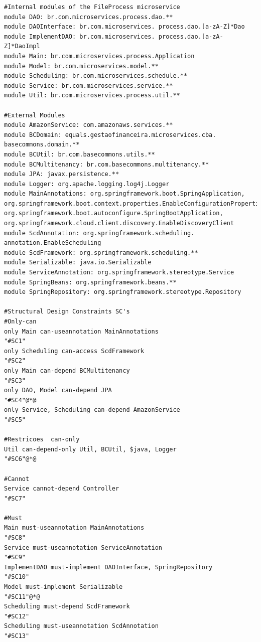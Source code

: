 \documentclass[12pt]{article}
\begin{document}
\begin{lstlisting}[style=colorido, caption={\textcolor{blue}{FileProcess microservice's architectural project specification.}},label={list:especArquiteturalFileProccess}
]
#Internal modules of the FileProcess microservice
module DAO: br.com.microservices.process.dao.**
module DAOInterface: br.com.microservices. process.dao.[a-zA-Z]*Dao
module ImplementDAO: br.com.microservices. process.dao.[a-zA-Z]*DaoImpl
module Main: br.com.microservices.process.Application
module Model: br.com.microservices.model.**
module Scheduling: br.com.microservices.schedule.**
module Service: br.com.microservices.service.**
module Util: br.com.microservices.process.util.**

#External Modules
module AmazonService: com.amazonaws.services.**
module BCDomain: equals.gestaofinanceira.microservices.cba. basecommons.domain.**
module BCUtil: br.com.basecommons.utils.**
module BCMultitenancy: br.com.basecommons.multitenancy.**
module JPA: javax.persistence.**
module Logger: org.apache.logging.log4j.Logger
module MainAnnotations: org.springframework.boot.SpringApplication, org.springframework.boot.context.properties.EnableConfigurationProperties, org.springframework.boot.autoconfigure.SpringBootApplication, org.springframework.cloud.client.discovery.EnableDiscoveryClient
module ScdAnnotation: org.springframework.scheduling. annotation.EnableScheduling
module ScdFramework: org.springframework.scheduling.**
module Serializable: java.io.Serializable
module ServiceAnnotation: org.springframework.stereotype.Service
module SpringBeans: org.springframework.beans.**
module SpringRepository: org.springframework.stereotype.Repository

#Structural Design Constraints SC's
#Only-can
only Main can-useannotation MainAnnotations																																						"#SC1"
only Scheduling can-access ScdFramework																																										"#SC2"
only Main can-depend BCMultitenancy																																														"#SC3"
only DAO, Model can-depend JPA																																				"#SC4"@*@
only Service, Scheduling can-depend AmazonService																																"#SC5"

#Restricoes  can-only
Util can-depend-only Util, BCUtil, $java, Logger																																	"#SC6"@*@
    
#Cannot
Service cannot-depend Controller																																																	"#SC7"
    
#Must
Main must-useannotation MainAnnotations																																										"#SC8"
Service must-useannotation ServiceAnnotation																																					"#SC9"
ImplementDAO must-implement DAOInterface, SpringRepository																							"#SC10"
Model must-implement Serializable																																																"#SC11"@*@
Scheduling must-depend ScdFramework																																														"#SC12"
Scheduling must-useannotation ScdAnnotation																																						"#SC13"

\end{lstlisting}
\end{document}
